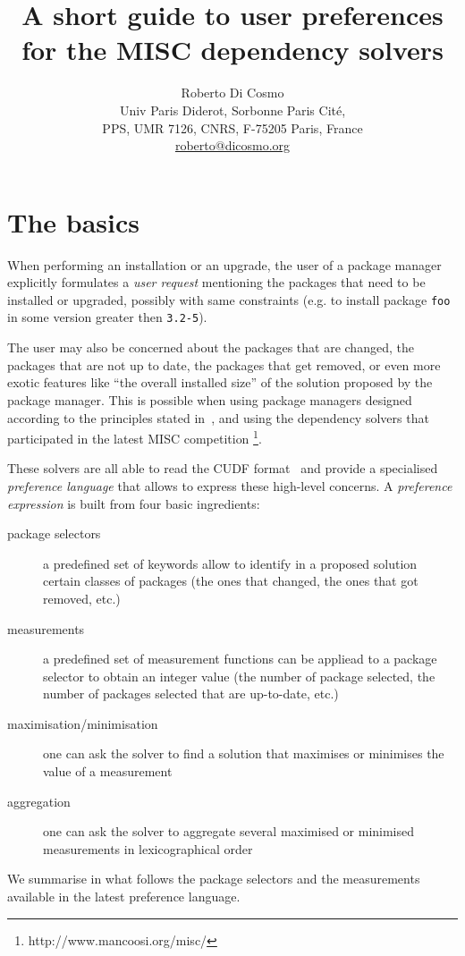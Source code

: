 \documentclass{article}
\title{A short guide to {\bf user preferences}\\ for the MISC dependency solvers}
\author{Roberto Di Cosmo\\Univ Paris Diderot, Sorbonne Paris Cit\'e,\\ PPS, UMR 7126, CNRS,
    F-75205 Paris, France\\\url{roberto@dicosmo.org}}
\date{\DATE{}}
\begin{document}
\maketitle

\section{The basics}

When performing an installation or an upgrade, the user of a package manager 
explicitly formulates a \emph{user request} mentioning the packages that need
to be installed or upgraded, possibly with same constraints (e.g. to
install package \texttt{foo} in some version greater then \texttt{3.2-5}).

The user may also be concerned about the packages that are changed, the packages
that are not up to date, the packages that get removed, or even more exotic
features like “the overall installed size” of the solution proposed by the
package manager. This is possible when using package managers designed
according to the principles stated in~\cite{DepSolversNP2012}, and
using the dependency solvers that participated in the latest MISC competition
\footnote{http://www.mancoosi.org/misc/}.

These solvers are all able to read the CUDF format~\cite{mancoosi-tr3} and provide
a specialised \emph{preference language} that allows to express these high-level
concerns.  A \emph{preference expression} is built from four basic ingredients:
\begin{description}
  \item[package selectors] a predefined set of keywords allow to identify in a proposed solution
                           certain classes of packages (the ones that changed, the ones that got removed, etc.)
  \item[measurements] a predefined set of measurement functions can be appliead to a package selector
                      to obtain an integer value (the number of package selected, the number of packages selected that are up-to-date, etc.)
  \item[maximisation/minimisation] one can ask the solver to find a solution that maximises or minimises the value of a measurement 
  \item[aggregation] one can ask the solver to aggregate several maximised or minimised measurements in lexicographical order
\end{description}

We summarise in what follows the package selectors and the measurements available in the latest preference language.
\end{document}
